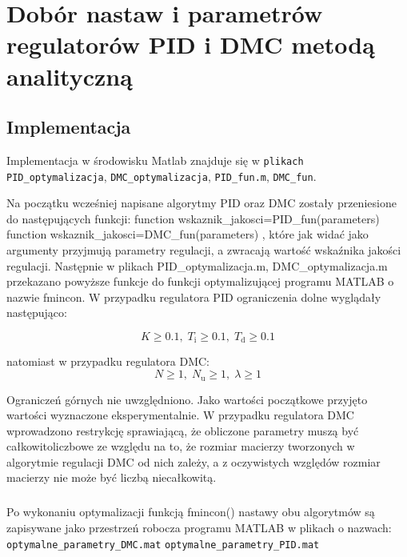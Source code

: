 \chapter{Dobór nastaw i parametrów regulatorów PID i DMC metodą analityczną}
    \section{Implementacja}
    Implementacja w środowisku Matlab znajduje się w \texttt{plikach PID\_optymalizacja}, \texttt{DMC\_optymalizacja}, \texttt{PID\_fun.m}, \texttt{DMC\_fun}.
    
    Na początku wcześniej napisane algorytmy PID oraz DMC zostały przeniesione do następujących funkcji:
    \newline
    function wskaznik\_jakosci=PID\_fun(parameters)
    \newline
    function wskaznik\_jakosci=DMC\_fun(parameters)
    \newline
    , które jak widać jako argumenty przyjmują parametry regulacji, a zwracają wartość wskaźnika jakości regulacji. Następnie w plikach PID\_optymalizacja.m, DMC\_optymalizacja.m przekazano powyższe funkcje do funkcji optymalizującej programu MATLAB o nazwie fmincon. W przypadku regulatora PID ograniczenia dolne wyglądały następująco:
    
    \begin{equation}
        K\geqslant{\num{0,1}},\;  T_{\mathrm{i}}\geqslant{\num{0,1}},\; T_{\mathrm{d}}\geqslant{\num{0,1}} 
    \end{equation}
    
    natomiast w przypadku regulatora DMC:
    \begin{equation}
 	    N\geqslant{1},\; N_{\mathrm{u}}\geqslant{1},\; \lambda\geqslant{1}
    \end{equation}
    
    Ograniczeń górnych nie uwzględniono. Jako wartości początkowe przyjęto wartości wyznaczone eksperymentalnie. W przypadku regulatora DMC wprowadzono restrykcję sprawiającą, że obliczone parametry muszą być całkowitoliczbowe ze względu na to, że rozmiar macierzy tworzonych w algorytmie regulacji DMC od nich zależy, a z oczywistych względów rozmiar macierzy nie może być liczbą niecałkowitą.
    \paragraph{}
    Po wykonaniu optymalizacji funkcją fmincon() nastawy obu algorytmów są zapisywane jako przestrzeń robocza programu MATLAB w plikach o nazwach:
    \newline\newline
    \texttt{optymalne\_parametry\_DMC.mat}
    \newline
    \texttt{optymalne\_parametry\_PID.mat}
